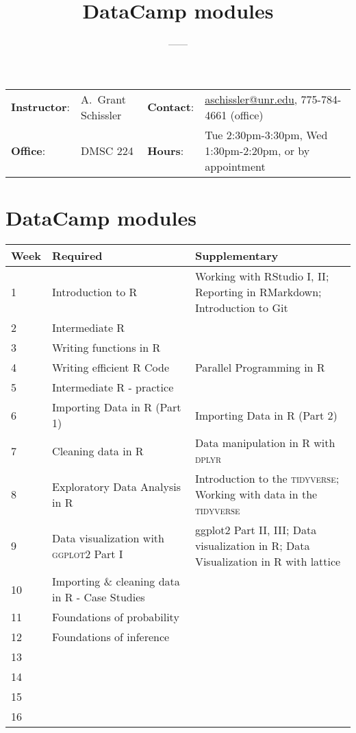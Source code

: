 \documentclass[11pt,onecolumn]{article}
\title{\textbf{\coursename\\DataCamp modules}}
\author{{\semester}---{\roomnumb}---{\classtimes}}
\date{}
\makeatletter
\newcommand{\myname}{A.~Grant Schissler}
\newcommand{\myemail}{aschissler@unr.edu}
\newcommand{\office}{DMSC 224}
\newcommand{\officehours}{Tue 2:30pm-3:30pm, Wed 1:30pm-2:20pm, or by appointment}
\makeatother
\begin{document}
\maketitle

\vspace{-0.25in}
\noindent\makebox[\linewidth]{\rule{\textwidth}{1pt}}

\begin{center}
\begin{tabular}{llll}
\textbf{Instructor}:&\myname & \textbf{Contact}:&\href{mailto:\myemail}{\myemail}, 775-784-4661 (office)\\
\textbf{Office}:&\office & \textbf{Hours}:&\officehours\\
\end{tabular}
\end{center}

\noindent\makebox[\linewidth]{\rule{\textwidth}{1pt}}

\section*{DataCamp modules}
\begin{center}
  \begin{tabular}{|p{0.05\linewidth}|p{0.45\linewidth}|p{0.5\linewidth}|}
    \hline
    Week & Required & Supplementary \\
    \hline
    \hline
    1 & Introduction to R & Working with RStudio I, II; Reporting in RMarkdown; Introduction to Git \\
    \hline
    2 & Intermediate R & \\
    \hline
    3 & Writing functions in R & \\
    \hline
    4 & Writing efficient R Code & Parallel Programming in R \\ 
    \hline
    5 & Intermediate R - practice & \\
    \hline
    \hline
    6 & Importing Data in R (Part 1) & Importing Data in R (Part 2) \\ 
    \hline
    7 & Cleaning data in R & Data manipulation in R with \textsc{dplyr} \\
    \hline
    8 & Exploratory Data Analysis in R & Introduction to the \textsc{tidyverse}; Working with data in the \textsc{tidyverse} \\
    \hline
    9 & Data visualization with \textsc{ggplot2} Part I & ggplot2 Part II, III; Data visualization in R; Data Visualization in R with lattice \\
    \hline
    10 & Importing \& cleaning data in R - Case Studies &  \\
    \hline
    \hline
    11 & Foundations of probability &  \\
    \hline
    12 & Foundations of inference &  \\
    \hline
    13 & & \\
    \hline
    14 & & \\
    \hline
    15 & & \\
    \hline
    \hline
    16 & & \\
    \hline
\end{tabular}
\end{center}
\end{document}
